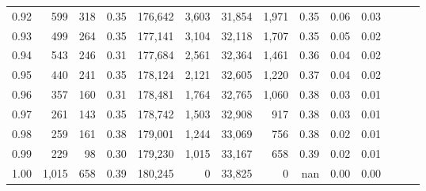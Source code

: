 \begin{tabular}{rrrrrrrrrrrrrr}
0.92 &    599 &  318 &  0.35 &  176,642 &    3,603 &  31,854 &   1,971 &  0.35 &  0.06 &      0.03 \\
0.93 &    499 &  264 &  0.35 &  177,141 &    3,104 &  32,118 &   1,707 &  0.35 &  0.05 &      0.02 \\
0.94 &    543 &  246 &  0.31 &  177,684 &    2,561 &  32,364 &   1,461 &  0.36 &  0.04 &      0.02 \\
0.95 &    440 &  241 &  0.35 &  178,124 &    2,121 &  32,605 &   1,220 &  0.37 &  0.04 &      0.02 \\
0.96 &    357 &  160 &  0.31 &  178,481 &    1,764 &  32,765 &   1,060 &  0.38 &  0.03 &      0.01 \\
0.97 &    261 &  143 &  0.35 &  178,742 &    1,503 &  32,908 &     917 &  0.38 &  0.03 &      0.01 \\
0.98 &    259 &  161 &  0.38 &  179,001 &    1,244 &  33,069 &     756 &  0.38 &  0.02 &      0.01 \\
0.99 &    229 &   98 &  0.30 &  179,230 &    1,015 &  33,167 &     658 &  0.39 &  0.02 &      0.01 \\
1.00 &  1,015 &  658 &  0.39 &  180,245 &        0 &  33,825 &       0 &   nan &  0.00 &      0.00 \\
\bottomrule
\end{tabular}
